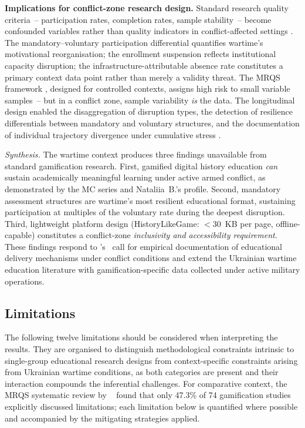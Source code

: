 \textbf{Implications for conflict-zone research design.} Standard research quality criteria~-- participation rates, completion rates, sample stability~-- become confounded variables rather than quality indicators in conflict-affected settings \cite{Burde2017, Kirk2007}. The mandatory--voluntary participation differential quantifies wartime's motivational reorganisation; the enrollment suspension reflects institutional capacity disruption; the infrastructure-attributable absence rate constitutes a primary context data point rather than merely a validity threat. The MRQS framework \cite{Korniienko2025mrqs}, designed for controlled contexts, assigns high risk to small variable samples~-- but in a conflict zone, sample variability \emph{is} the data. The longitudinal design enabled the disaggregation of disruption types, the detection of resilience differentials between mandatory and voluntary structures, and the documentation of individual trajectory divergence under cumulative stress \cite{Burde2017, Kirk2007}.

\textit{Synthesis.} The wartime context produces three findings unavailable from standard gamification research. First, gamified digital history education \emph{can} sustain academically meaningful learning under active armed conflict, as demonstrated by the MC series and Nataliia~B.'s profile. Second, mandatory assessment structures are wartime's most resilient educational format, sustaining participation at multiples of the voluntary rate during the deepest disruption. Third, lightweight platform design (HistoryLikeGame: $<$30~KB per page, offline-capable) constitutes a conflict-zone \emph{inclusivity and accessibility requirement}. These findings respond to \citeauthor{Burde2017}'s~\cite{Burde2017} call for empirical documentation of educational delivery mechanisms under conflict conditions and extend the Ukrainian wartime education literature \cite{Martynets202428, Ovcharuk2023, Zhumbei2025} with gamification-specific data collected under active military operations.

\subsection{Limitations} \label{sec:limitations}

The following twelve limitations should be considered when interpreting the results. They are organised to distinguish methodological constraints intrinsic to single-group educational research designs from context-specific constraints arising from Ukrainian wartime conditions, as both categories are present and their interaction compounds the inferential challenges. For comparative context, the MRQS systematic review by \citeauthor{Korniienko2025mrqs}~\cite{Korniienko2025mrqs} found that only 47.3\% of 74 gamification studies explicitly discussed limitations; each limitation below is quantified where possible and accompanied by the mitigating strategies applied.

